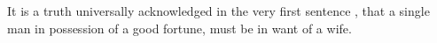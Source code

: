 \documentclass{article}
\begin{document}
 
It is a truth universally acknowledged%
in the very first sentence
, that a single man in possession of a good fortune, must
be in want of a wife.
\end{document}
